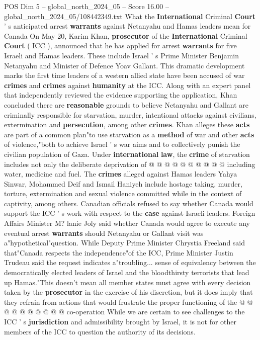 \begin{textsample}{POS Dim 5 – global\_north\_2024\_05 – Score 16.00 – global\_north\_2024\_05/108442349.txt}  \label{ex:f5_pos_180}
What the \textbf{International} Criminal \textbf{Court} ' s anticipated arrest \textbf{warrants} against Netanyahu and Hamas leaders mean for Canada On May 20, Karim Khan, \textbf{prosecutor} of the \textbf{International} Criminal \textbf{Court} ( ICC ), announced that he has applied for arrest \textbf{warrants} for five Israeli and Hamas leaders.
These include Israel ' s Prime Minister Benjamin Netanyahu and Minister of Defence Yoav Gallant.
This dramatic development marks the first time leaders of a western allied state have been accused of war \textbf{crimes} and \textbf{crimes} against \textbf{humanity} at the ICC.
Along with an expert panel that independently reviewed the evidence supporting the application, Khan concluded there are \textbf{reasonable} grounds to believe Netanyahu and Gallant are criminally responsible for starvation, murder, intentional attacks against civilians, extermination and \textbf{persecution}, among other \textbf{crimes}.
Khan alleges these \textbf{acts} are part of a common plan"to use starvation as a \textbf{method} of war and other \textbf{acts} of violence,"both to achieve Israel ' s war aims and to collectively punish the civilian population of Gaza.
Under \textbf{international} \textbf{law}, the \textbf{crime} of starvation includes not only the deliberate deprivation of @ @ @ @ @ @ @ @ @ @ including water, medicine and fuel.
The \textbf{crimes} alleged against Hamas leaders Yahya Sinwar, Mohammed Deif and Ismail Haniyeh include hostage taking, murder, torture, extermination and sexual violence committed while in the context of captivity, among others.
Canadian officials refused to say whether Canada would support the ICC ' s work with respect to the \textbf{case} against Israeli leaders.
Foreign Affairs Minister M? lanie Joly said whether Canada would agree to execute any eventual arrest \textbf{warrants} should Netanyahu or Gallant visit was a"hypothetical"question.
While Deputy Prime Minister Chrystia Freeland said that"Canada respects the independence"of the ICC, Prime Minister Justin Trudeau said the request indicates a"troubling... sense of equivalency between the democratically elected leaders of Israel and the bloodthirsty terrorists that lead up Hamas."This doesn't mean all member states must agree with every decision taken by the \textbf{prosecutor} in the exercise of his discretion, but it does imply that they refrain from actions that would frustrate the proper functioning of the @ @ @ @ @ @ @ @ @ @ co-operation While we are certain to see challenges to the ICC ' s \textbf{jurisdiction} and admissibility brought by Israel, it is not for other members of the ICC to question the authority of its decisions.

\end{textsample}
